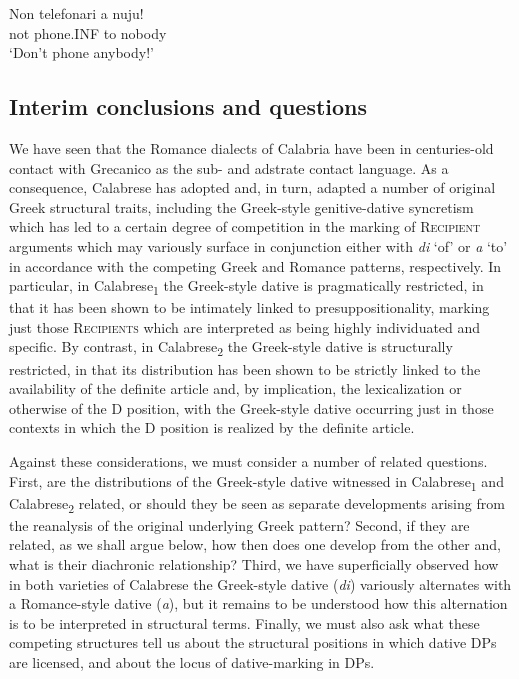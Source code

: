 \documentclass[output=paper,modfonts,nonflat]{langsci/langscibook}
\begin{document}
\ex  
    \gll Non  telefonari  a  nuju!\\
    not  phone.INF   to  nobody\\
    \glt `Don’t phone anybody!'
\z
\z

\subsection{Interim conclusions and questions}

We have seen that the Romance dialects of Calabria have been in centuries-old contact with Grecanico as the sub- and adstrate contact language. As a consequence, Calabrese has adopted and, in turn, adapted a number of original Greek structural traits, including the Greek-style genitive-dative syncretism which has led to a certain degree of competition in the marking of \textsc{Recipient} arguments which may variously surface in conjunction either with \textit{di} ‘of’ or \textit{a} ‘to’ in accordance with the competing Greek and Romance patterns, respectively. In particular, in Calabrese\textsubscript{1} the Greek-style dative is pragmatically restricted, in that it has been shown to be intimately linked to presuppositionality, marking just those \textsc{Recipients} which are interpreted as being highly individuated and specific. By contrast, in Calabrese\textsubscript{2} the Greek-style dative is structurally restricted, in that its distribution has been shown to be strictly linked to the availability of the definite article and, by implication, the lexicalization or otherwise of the D position, with the Greek-style dative occurring just in those contexts in which the D position is realized by the definite article.

Against these considerations, we must consider a number of related questions. First, are the distributions of the Greek-style dative witnessed in Calabrese\textsubscript{1} and Calabrese\textsubscript{2} related, or should they be seen as separate developments arising from the reanalysis of the original underlying Greek pattern? Second, if they are related, as we shall argue below, how then does one develop from the other and, what is their diachronic relationship? Third, we have superficially observed how in both varieties of Calabrese the Greek-style dative (\textit{di}) variously alternates with a Romance-style dative (\textit{a}), but it remains to be understood how this alternation is to be interpreted in structural terms. Finally, we must also ask what these competing structures tell us about the structural positions in which dative DPs are licensed, and about the locus of dative-marking in DPs.
\end{document}
